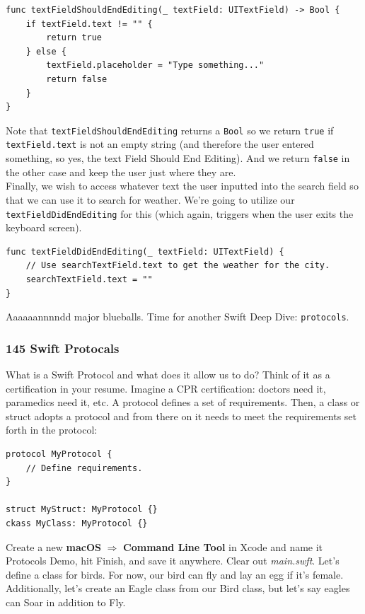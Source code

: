 \documentclass[12pt, letterpaper]{article}
\begin{document}
\begin{verbatim}
func textFieldShouldEndEditing(_ textField: UITextField) -> Bool {
    if textField.text != "" {
        return true
    } else {
        textField.placeholder = "Type something..."
        return false
    }
}
\end{verbatim}

Note that \verb+textFieldShouldEndEditing+ returns a \verb+Bool+ so we return \verb+true+ if 
\newline \verb+textField.text+ is not an empty string (and therefore the user entered something, so yes, 
the text Field Should End Editing). And we return \verb+false+ in the other case and keep the user just where they are. \\

Finally, we wish to access whatever text the user inputted into the search field so that we can use it to search for
weather. We're going to utilize our \newline \verb+textFieldDidEndEditing+ for this (which again, triggers when the user exits
the keyboard screen).

\begin{verbatim}
func textFieldDidEndEditing(_ textField: UITextField) {
    // Use searchTextField.text to get the weather for the city.
    searchTextField.text = ""
}
\end{verbatim}

Aaaaaannnndd major blueballs. Time for another Swift Deep Dive: \verb+protocols+.

\subsubsection*{145 Swift Protocals}

What is a Swift Protocol and what does it allow us to do? Think of it as a certification in your resume. Imagine a 
CPR certification: doctors need it, paramedics need it, etc. A protocol defines a set of requirements. Then, a 
class or struct adopts a protocol and from there on it needs to meet the requirements set forth in the protocol:

\begin{verbatim}
protocol MyProtocol {
    // Define requirements.
}

struct MyStruct: MyProtocol {}
ckass MyClass: MyProtocol {}
\end{verbatim}

Create a new \textbf{macOS} $\Rightarrow$ \textbf{Command Line Tool} in Xcode and name it Protocols Demo, hit Finish,
and save it anywhere. Clear out \emph{main.swft}. Let's define a class for birds. For now, our bird can fly and lay
an egg if it's female. Additionally, let's create an Eagle class from our Bird class, but let's say eagles can Soar
in addition to Fly. 
\end{document}
